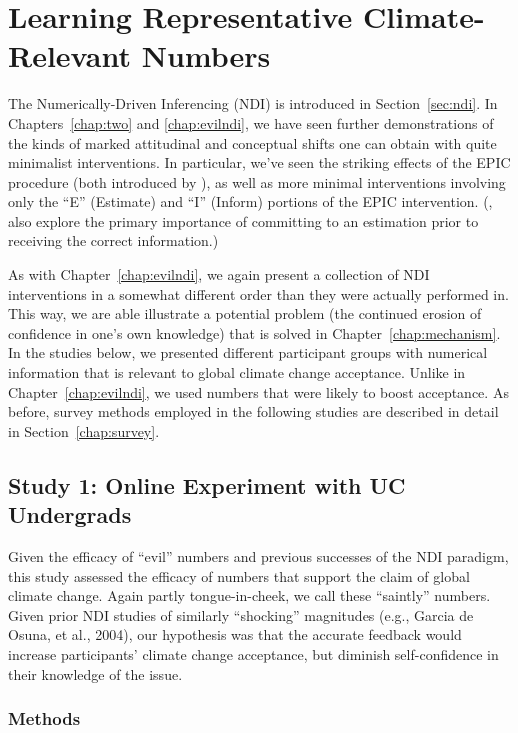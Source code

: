 \graphicspath{{pro-ndi/}}

\chapter{Learning Representative Climate-Relevant Numbers}
\label{chap:prondi}

The Numerically-Driven Inferencing (NDI) is introduced in Section~\ref{sec:ndi}.
In Chapters~\ref{chap:two} and \ref{chap:evilndi}, we have seen further
demonstrations of the kinds of marked attitudinal and conceptual shifts one can
obtain with quite minimalist interventions. In particular, we've seen the
striking effects of the EPIC procedure (both introduced by
\cite{ranney_numerically_2001_fixed}), as well as more minimal
interventions involving only the “E” (Estimate) and “I” (Inform) portions of the
EPIC intervention. (\cite{rinne_estimation_2006}, also explore the primary
importance of committing to an estimation prior to receiving the correct
information.)

As with Chapter~\ref{chap:evilndi}, we again present a collection of NDI
interventions in a somewhat different order than they were actually performed
in. This way, we are able illustrate a potential problem (the continued erosion
of confidence in one's own knowledge) that is solved in
Chapter~\ref{chap:mechanism}.  In the studies below, we presented different
participant groups with numerical information that is relevant to global climate
change acceptance.  Unlike in Chapter~\ref{chap:evilndi}, we used numbers that
were likely to boost acceptance. As before, survey methods employed in the
following studies are described in detail in Section~\ref{chap:survey}.

\section{Study 1: Online Experiment with UC Undergrads}
\label{sec:pro-uc}

Given the efficacy of “evil” numbers and previous successes of the NDI paradigm,
this study assessed the efficacy of numbers that support the claim of global
climate change. Again partly tongue-in-cheek, we call these “saintly” numbers.
Given prior NDI studies of similarly “shocking” magnitudes (e.g., Garcia de
Osuna, et al., 2004), our hypothesis was that the accurate feedback would
increase participants’ climate change acceptance, but diminish self-confidence
in their knowledge of the issue.


\subsection{Methods}

